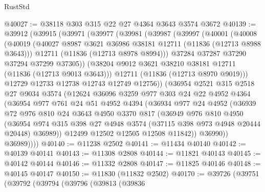 \begin{lexlean}{RustStd}
\begin{coremodule}
@40027 := @38118 @303 @315 @22 @27 @4364 @3643 @3574 @3672
@40139 := @39912
    (@39915
      (@39971
        (@39977
          (@39981
            (@39987
              (@39997
                (@40001
                  (@40008
                    (@40019
                      (@40027 @8987 @3621 @36986 @38181 @12711 (@11836 (@12713 @8988 @3643)))
                      @12711
                      (@11836 (@12713 @8978 @8994)))
                    @37284
                    @37287
                    @37290
                    @37294
                    @37299
                    @37305))
                (@38204 @9012 @3621 @38210 @38181 @12711 (@11836 (@12713 @9013 @3643)))
                @12711
                (@11836 (@12713 @8970 @9019)))
              @12729
              @12733
              @12738
              @12743
              @12749
              @12756))
          (@36954
            @2521
            @315
            @2518
            @27
            @9034
            @3574
            (@12624
              @36096
              @3259
              @977
              @303
              @24
              @22
              @4952
              @4364
              (@36954
                @977
                @761
                @24
                @51
                @4952
                @4394
                (@36934
                  @977
                  @24
                  @4952
                  (@36939
                    @72
                    @976
                    @810
                    @24
                    @3643
                    @4950
                    @3370
                    @817
                    (@36949
                      @976
                      @810
                      @4950
                      (@36954
                        @974
                        @315
                        @398
                        @27
                        @4948
                        @3574
                        (@37115 @398 @973 @4948 @20444 @20448)
                        @36989))
                    @12499
                    @12502
                    @12505
                    @12508
                    @11842))
                @36990))
            @36989))))
@40140 := @11238 @2502
@40141 := @11434 @40140
@40142 := @40139 @40141
@40143 := @11308 @2808
@40144 := @11821 @40143
@40145 := @40142 @40144
@40146 := @11332 @2808
@40147 := @11825 @40146
@40148 := @40145 @40147
@40150 := @11830 (@11832 @2502)
@40170 := @39726
    (@39751
      (@39792
        (@39794
          (@39796
            (@39813
              (@39836

\end{coremodule}
\end{lexlean}
